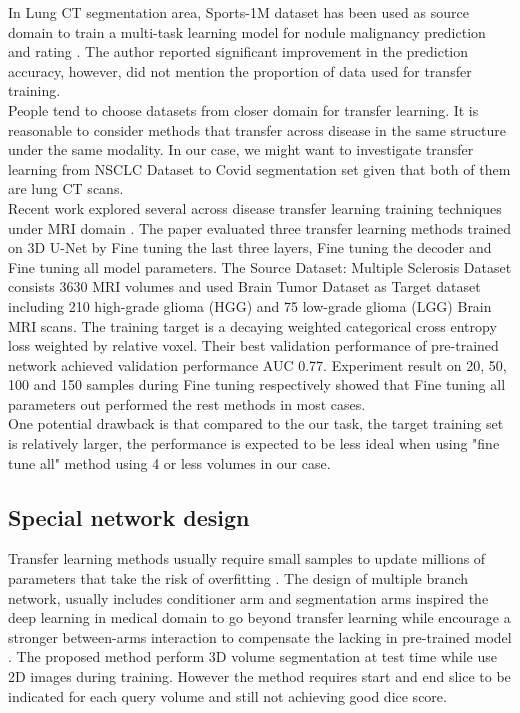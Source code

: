 In Lung CT segmentation area, Sports-1M dataset has been used as source domain to train a multi-task learning model for nodule malignancy prediction and rating \cite{hussein_risk_2017}. The author reported significant improvement in the prediction accuracy, however, did not mention the proportion of data used for transfer training.\\

People tend to choose datasets from closer domain for transfer learning. It is reasonable to consider methods that transfer across disease in the same structure under the same modality. In our case, we might want to investigate transfer learning from NSCLC Dataset to Covid segmentation set given that both of them are lung CT scans.\\

Recent work explored several across disease transfer learning training techniques under MRI domain \cite{wang_improving_2019}. The paper evaluated three transfer learning methods trained on 3D U-Net by Fine tuning the last three layers, Fine tuning the decoder and Fine tuning all model parameters. 
The Source Dataset: Multiple Sclerosis Dataset consists 3630 MRI volumes and used Brain Tumor Dataset as Target dataset including 210 high-grade glioma (HGG) and 75 low-grade glioma (LGG) Brain MRI scans. The training target is a decaying weighted categorical cross entropy loss weighted by relative voxel. Their best validation performance of pre-trained network achieved validation performance AUC 0.77. Experiment result on 20, 50, 100 and 150 samples during Fine tuning respectively showed that Fine tuning all parameters out performed the rest methods in most cases.\\

One potential drawback is that compared to the our task, the target training set is relatively larger, the performance is expected to be less ideal when using "fine tune all" method using 4 or less volumes in our case.

\subsection{Special network design}
Transfer learning methods usually require small samples to update millions of parameters that take the risk of overfitting \cite{shaban_one-shot_2017}. The design of multiple branch network, usually includes conditioner arm and segmentation arms inspired the deep learning in medical domain to go beyond transfer learning while encourage a stronger between-arms interaction to compensate the lacking in pre-trained model \cite{roy_squeeze_2019}. The proposed method perform 3D volume segmentation at test time while use 2D images during training. However the method requires start and end slice to be indicated for each query volume and still not achieving good dice score.\\

